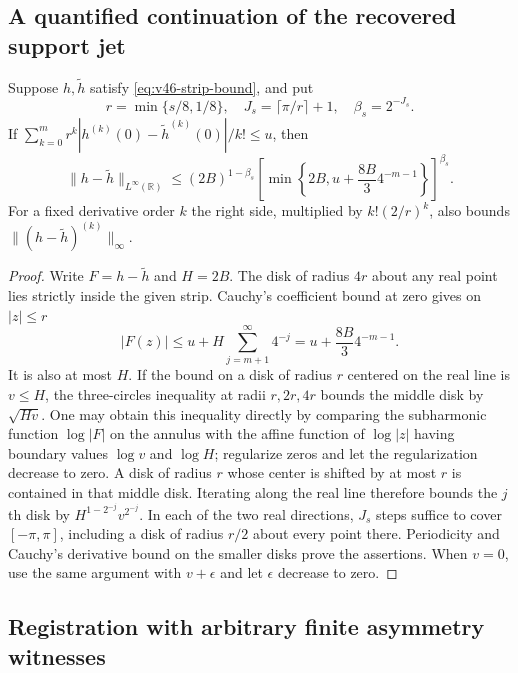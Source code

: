 \subsection{A quantified continuation of the recovered support jet}

\begin{lemma}
\label{lem:v46-continuation}
Suppose $h,\widetilde h$ satisfy \eqref{eq:v46-strip-bound}, and put
\[
 r=\min\{s/8,1/8\},\quad
 J_s=\lceil\pi/r\rceil+1,\quad \beta_s=2^{-J_s}.
\]
If $\sum_{k=0}^m r^k|h^{(k)}(0)-\widetilde h^{(k)}(0)|/k!\le u$,
then
\begin{equation}\label{eq:v46-continuation-bound}
 \|h-\widetilde h\|_{L^\infty(\mathbb R)}
 \le (2B)^{1-\beta_s}
 \left[\min\left\{2B,u+\frac{8B}{3}4^{-m-1}\right\}\right]^{\beta_s}.
\end{equation}
For a fixed derivative order $k$ the right side, multiplied by
$k!(2/r)^k$, also bounds $\|(h-\widetilde h)^{(k)}\|_\infty$.
\end{lemma}

\begin{proof}
Write $F=h-\widetilde h$ and $H=2B$.  The disk of radius $4r$ about any
real point lies strictly inside the given strip.  Cauchy's coefficient
bound at zero gives on $|z|\le r$
\[
 |F(z)|\le u+H\sum_{j=m+1}^\infty4^{-j}
           =u+\frac{8B}{3}4^{-m-1}.
\]
It is also at most $H$.  If the bound on a disk of radius $r$ centered
on the real line is $v\le H$, the three-circles inequality at radii
$r,2r,4r$ bounds the middle disk by $\sqrt{Hv}$.
One may obtain this inequality directly by comparing the subharmonic
function $\log|F|$ on the annulus with the affine function of $\log|z|$
having boundary values $\log v$ and $\log H$; regularize zeros and let
the regularization decrease to zero.
A disk of radius $r$ whose center is shifted by at most $r$ is contained
in that middle disk.  Iterating along the real line therefore bounds the
$j$th disk by $H^{1-2^{-j}}v^{2^{-j}}$.  In each of the two real directions,
$J_s$ steps suffice to cover $[-\pi,\pi]$, including a disk of radius
$r/2$ about every point there.  Periodicity and Cauchy's derivative bound
on the smaller disks prove the assertions.  When $v=0$, use the same
argument with $v+\epsilon$ and let $\epsilon$ decrease to zero.
\end{proof}

\subsection{Registration with arbitrary finite asymmetry witnesses}

